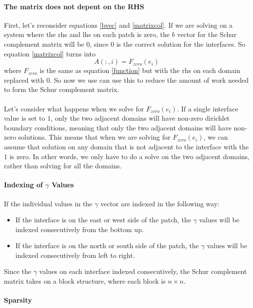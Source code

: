 \documentclass[12pt]{article}
\begin{document}
\paragraph{The matrix does not depent on the RHS}
First, let's reconsider equations  \eqref{bvec} and \eqref{matrixcol}. If we are solving on a system
where the rhs and lhs on each patch is zero, the $b$ vector for the Schur complement matrix will
be $0$, since $0$ is the correct solution for the interfaces. So equation \ref{matrixcol} turns into
\begin{equation}
    A(:,i) = F_{zero}(e_i)
\end{equation}
where $F_{zero}$ is the same as equation \ref{function} but with the rhs on each domain replaced 
with $0$.
So now we use can use this to reduce the amount of work needed to form the Schur complement matrix.
\\
\\
Let's consider what happens when we solve for $F_{zero}(e_i)$. If a single interface value is set
to $1$, only the two adjacent domains will have non-zero dirichlet boundary conditions, meaning that
only the two adjacent domains will have non-zero solutions. This means that when we are solving for 
$F_{zero}(e_i)$, we can  assume that solution on any domain that is not adjacent to the interface
with the $1$ is zero. In other words, we only have to do a solve on the two adjacent domains, rather
than solving for all the domains.

\paragraph{Indexing of $\gamma$ Values} 
If the individual values in the $\gamma$ vector are indexed in the following way:
\begin{itemize}
    \item If the interface is on the east or west side of the patch, the $\gamma$ values will be indexed consecutively from the bottom up.
    \item If the interface is on the north or south side of the patch, the $\gamma$ values will be indexed consecutively from left to right.
\end{itemize}
Since the $\gamma$ values on each interface indexed consecutively, the Schur complement matrix takes
on a block structure, where each block is $n\times n$.
\paragraph{Sparsity}
\end{document}
